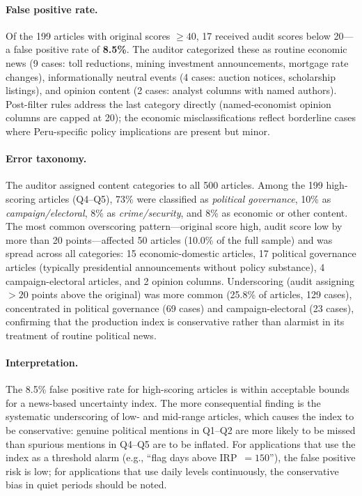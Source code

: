 \documentclass[12pt,a4paper]{article}
\begin{document}
\paragraph{False positive rate.}
Of the 199 articles with original scores $\geq 40$, 17 received audit scores
below 20---a false positive rate of \textbf{8.5\%}.  The auditor categorized
these as routine economic news (9 cases: toll reductions, mining investment
announcements, mortgage rate changes), informationally neutral events (4 cases:
auction notices, scholarship listings), and opinion content (2 cases: analyst
columns with named authors).  Post-filter rules address the last category
directly (named-economist opinion columns are capped at 20); the economic
misclassifications reflect borderline cases where Peru-specific policy
implications are present but minor.

\paragraph{Error taxonomy.}
The auditor assigned content categories to all 500 articles.  Among the
199 high-scoring articles (Q4--Q5), 73\% were classified as
\emph{political governance}, 10\% as \emph{campaign/electoral}, 8\% as
\emph{crime/security}, and 8\% as economic or other content.  The most
common overscoring pattern---original score high, audit score low by more than
20 points---affected 50 articles (10.0\% of the full sample) and was spread
across all categories: 15 economic-domestic articles, 17 political governance
articles (typically presidential announcements without policy substance), 4
campaign-electoral articles, and 2 opinion columns.  Underscoring (audit
assigning $> 20$ points above the original) was more common (25.8\% of
articles, 129 cases), concentrated in political governance (69 cases) and
campaign-electoral (23 cases), confirming that the production index is
conservative rather than alarmist in its treatment of routine political news.

\paragraph{Interpretation.}
The 8.5\% false positive rate for high-scoring articles is within acceptable
bounds for a news-based uncertainty index.  The more consequential finding is
the systematic underscoring of low- and mid-range articles, which causes the
index to be conservative: genuine political mentions in Q1--Q2 are more likely
to be missed than spurious mentions in Q4--Q5 are to be inflated.  For
applications that use the index as a threshold alarm (e.g., ``flag days above
IRP~$= 150$''), the false positive risk is low; for applications that use daily
levels continuously, the conservative bias in quiet periods should be noted.
\end{document}
